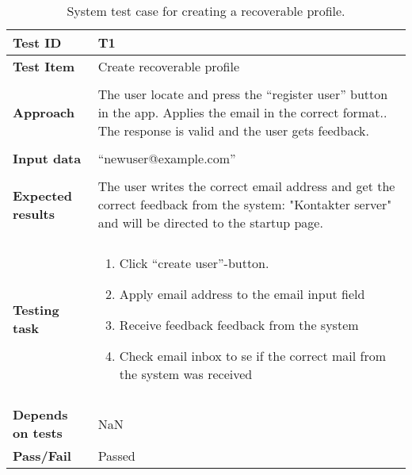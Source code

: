 \begin{table}[H]
	\centering
	\caption{System test case for creating a recoverable profile.}
	\begin{adjustbox}{center}
	\begin{tabular}[b]{ | l | l  |}
		\hline
		\textbf{Test ID} & T1  \\ \hline
		\textbf{Test Item} & Create recoverable profile \\ \hline&\\[-2ex]
		\textbf{Approach} & \begin{minipage}{5in}The user locate and press the “register user” button in the app. Applies the email in the correct format.. The response is valid and the user gets feedback. \end{minipage}\\ &\\[-2ex]\hline
		\textbf{Input data} &  “newuser@example.com”\\ \hline&\\[-2ex]
		
		\textbf{Expected results} & \begin{minipage}{5in}The user writes the correct email address and get the correct feedback from the system: "Kontakter server" and will be directed to the startup page.\end{minipage}\\ \hline&\\[-2ex]
		
		\textbf{Testing task} & \begin{minipage}{5in}
			\begin{enumerate}[noitemsep]
				\item Click  “create user”-button.
				\item Apply email address to the email input field 
				\item Receive feedback feedback from the system
				\item Check email inbox to se if the correct mail from the system was received 
			\end{enumerate} \end{minipage}
			\\&\\[-2ex] \hline
			\textbf{Depends on tests}& NaN \\ \hline	
			\textbf{Pass/Fail} & Passed \\\hline				
		\end{tabular}
		\end{adjustbox}
		\label{Tab:systemtest1}
	\end{table}
	

